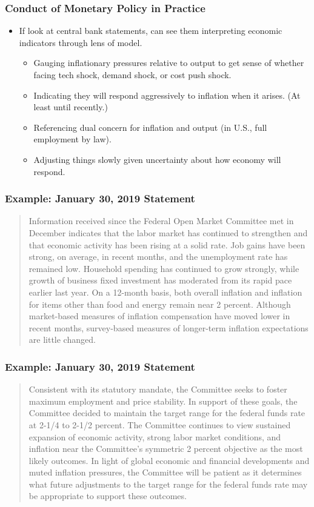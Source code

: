 \documentclass[english,xcolor=svgnames]{beamer}
\begin{document}
\begin{frame}
\frametitle{Conduct of Monetary Policy in Practice}
\begin{itemize}
	\item If look at central bank statements, can see them interpreting economic indicators through lens of model.
	\begin{itemize}
		\item Gauging inflationary pressures relative to output to get sense of whether facing tech shock, demand shock, or cost push shock.
		\item Indicating they will respond aggressively to inflation when it arises. (At least until recently.)
		\item Referencing dual concern for inflation and output (in U.S., full employment by law).
		\item Adjusting things slowly given uncertainty about how economy will respond.
	\end{itemize}
 \end{itemize}
\end{frame}

\begin{frame}
\frametitle{Example: January 30, 2019 Statement}
\begin{quotation}
	Information received since the Federal Open Market Committee met in December indicates that the labor market has continued to strengthen and that economic activity has been rising at a solid rate. Job gains have been strong, on average, in recent months, and the unemployment rate has remained low. Household spending has continued to grow strongly, while growth of business fixed investment has moderated from its rapid pace earlier last year. On a 12-month basis, both overall inflation and inflation for items other than food and energy remain near 2 percent. Although market-based measures of inflation compensation have moved lower in recent months, survey-based measures of longer-term inflation expectations are little changed.
\end{quotation}
\end{frame}


\begin{frame}
\frametitle{Example: January 30, 2019 Statement}
\begin{quotation}
	
Consistent with its statutory mandate, the Committee seeks to foster maximum employment and price stability. In support of these goals, the Committee decided to maintain the target range for the federal funds rate at 2-1/4 to 2-1/2 percent. The Committee continues to view sustained expansion of economic activity, strong labor market conditions, and inflation near the Committee's symmetric 2 percent objective as the most likely outcomes. In light of global economic and financial developments and muted inflation pressures, the Committee will be patient as it determines what future adjustments to the target range for the federal funds rate may be appropriate to support these outcomes.
\end{quotation}
\end{frame}
\end{document}
